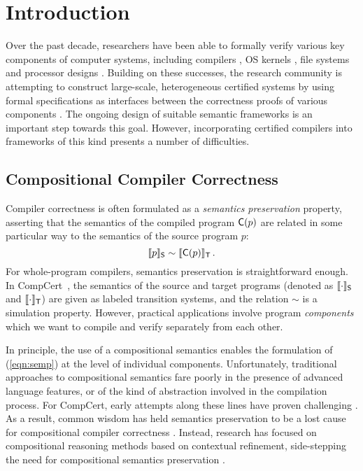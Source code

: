 \section{Introduction}
\label{sec:intro}

Over the past decade, researchers have been able to formally verify
various key components of computer systems, including compilers
\cite{compcert,cakeml,vellvm}, OS kernels \cite{sel4,dscal15,certikos-osdi16},
file systems \cite{fscq} and processor designs \cite{safe,kami}.
Building on these successes, the research community is attempting to
construct large-scale, heterogeneous certified systems by using formal
specifications as interfaces between the correctness proofs of various
components \cite{deepspec}.  The ongoing design of suitable semantic
frameworks is an important step towards this goal.  However,
incorporating certified compilers into frameworks of this kind
presents a number of difficulties.

\subsection{Compositional Compiler Correctness}
\label{ssec:intro-ccc}

Compiler correctness is often formulated as a \emph{semantics
preservation} property, asserting that the semantics of the compiled
program $ \mathsf{C} (p)$ are related in some particular way to the
semantics of the source program $p$:
\begin{equation} \label{eqn:semp}
  \llbracket p \rrbracket_{ \mathsf{S} } \sim
  \llbracket  \mathsf{C} (p) \rrbracket_{ \mathsf{T} }
  \,.
\end{equation}
For whole-program compilers, semantics preservation is straightforward
enough.  In CompCert~\cite{compcert}, the semantics of the source and
target programs (denoted as $\llbracket \cdot \rrbracket_{ \mathsf{S} }$
and $\llbracket \cdot \rrbracket_{ \mathsf{T} }$)
are given as labeled transition systems, and the
relation $\sim$ is a simulation property.
However, practical applications involve program \emph{components}
which we want to compile and verify separately from each other.

In
principle, the use of a compositional semantics enables the
formulation of (\ref{eqn:semp}) at the level of individual components.
Unfortunately, traditional approaches to compositional semantics fare
poorly in the presence of advanced language features, or of the kind
of abstraction involved in the compilation process.  For CompCert,
early attempts along these lines have proven challenging
\cite{cpp15,compcompcert}.
%
As a result, common wisdom has held semantics preservation to be a lost
cause for compositional compiler correctness \cite{next700}.  Instead,
research has focused on compositional reasoning methods based on
contextual refinement, side-stepping the need for compositional
semantics preservation \cite{sepcompcert,compcertm}.


